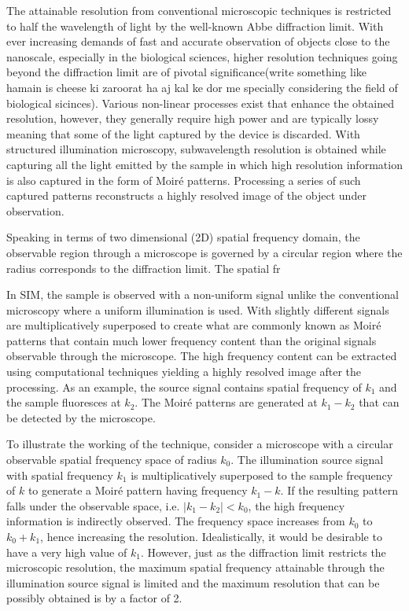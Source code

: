 \documentclass[11pt]{article}
\begin{document}
The attainable resolution from conventional microscopic techniques is restricted to half the wavelength of light by the well-known Abbe diffraction limit. With ever increasing demands of fast and accurate observation of objects close to the nanoscale, especially in the biological sciences, higher resolution techniques going beyond the diffraction limit are of pivotal significance(write something like hamain is cheese ki zaroorat ha aj kal ke dor me specially considering the field of biological sicinces). Various non-linear processes exist that enhance the obtained resolution, however, they generally require high power and are typically lossy meaning that some of the light captured by the device is discarded. With structured illumination microscopy, subwavelength resolution is obtained while capturing all the light emitted by the sample in which high resolution information is also captured in the form of Moir\'e patterns. Processing a series of such captured patterns reconstructs a highly resolved image of the object under observation.

Speaking in terms of two dimensional (2D) spatial frequency domain, the observable region through a microscope is governed by a circular region where the radius corresponds to the diffraction limit. The spatial fr

In SIM, the sample is observed with a non-uniform signal unlike the conventional microscopy where a uniform illumination is used. With slightly different signals are multiplicatively superposed to create what are commonly known as Moir\'e patterns that contain much lower frequency content than the original signals observable through the microscope. The high frequency content can be extracted using computational techniques yielding a highly resolved image after the processing. As an example, the source signal contains spatial frequency of $k_1$ and the sample fluoresces at $k_2$. The Moir\'e patterns are generated at $k_1 - k_2$ that can be detected by the microscope.


To illustrate the working of the technique, consider a microscope with a circular observable spatial frequency space of radius $k_0$. The illumination source signal with spatial frequency $k_1$ is multiplicatively superposed to the sample frequency of $k$ to generate a Moir\'e pattern having frequency $k_1 - k$. If the resulting pattern falls under the observable space, i.e. $| k_1 - k_2| < k_0$, the high frequency information is indirectly observed. The frequency space increases from $k_0$ to $k_0 + k_1$, hence increasing the resolution. Idealistically, it would be desirable to have a very high value of $k_1$. However, just as the diffraction limit restricts the microscopic resolution, the maximum spatial frequency attainable through the illumination source signal is limited and the maximum resolution that can be possibly obtained is by a factor of 2.
\end{document}
